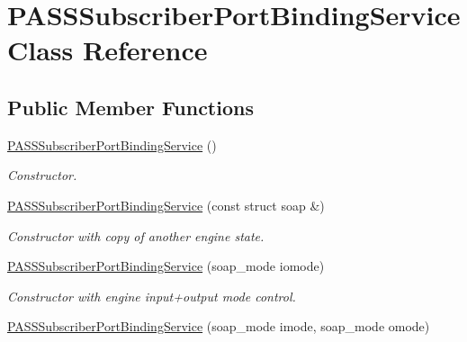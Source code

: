 \hypertarget{classPASSSubscriberPortBindingService}{
\section{PASSSubscriberPortBindingService Class Reference}
\label{classPASSSubscriberPortBindingService}
}
\subsection*{Public Member Functions}
\begin{DoxyCompactItemize}
\item 
\hypertarget{classPASSSubscriberPortBindingService_a2382f9f2d5e79333353dc81852a8b6fb}{
\hyperlink{classPASSSubscriberPortBindingService_a2382f9f2d5e79333353dc81852a8b6fb}{PASSSubscriberPortBindingService} ()}
\label{classPASSSubscriberPortBindingService_a2382f9f2d5e79333353dc81852a8b6fb}

\begin{DoxyCompactList}\small\item\em Constructor. \item\end{DoxyCompactList}\item 
\hypertarget{classPASSSubscriberPortBindingService_ac51b748a75f87158d80c9f58e919eaa3}{
\hyperlink{classPASSSubscriberPortBindingService_ac51b748a75f87158d80c9f58e919eaa3}{PASSSubscriberPortBindingService} (const struct soap \&)}
\label{classPASSSubscriberPortBindingService_ac51b748a75f87158d80c9f58e919eaa3}

\begin{DoxyCompactList}\small\item\em Constructor with copy of another engine state. \item\end{DoxyCompactList}\item 
\hypertarget{classPASSSubscriberPortBindingService_aeab377e17700260ba833e2724d8a2ecc}{
\hyperlink{classPASSSubscriberPortBindingService_aeab377e17700260ba833e2724d8a2ecc}{PASSSubscriberPortBindingService} (soap\_\-mode iomode)}
\label{classPASSSubscriberPortBindingService_aeab377e17700260ba833e2724d8a2ecc}

\begin{DoxyCompactList}\small\item\em Constructor with engine input+output mode control. \item\end{DoxyCompactList}\item 
\hypertarget{classPASSSubscriberPortBindingService_a00547cce359785cc8e0f52d39c5d16bf}{
\hyperlink{classPASSSubscriberPortBindingService_a00547cce359785cc8e0f52d39c5d16bf}{PASSSubscriberPortBindingService} (soap\_\-mode imode, soap\_\-mode omode)}
\label{classPASSSubscriberPortBindingService_a00547cce359785cc8e0f52d39c5d16bf}


\end{DoxyCompactItemize}
